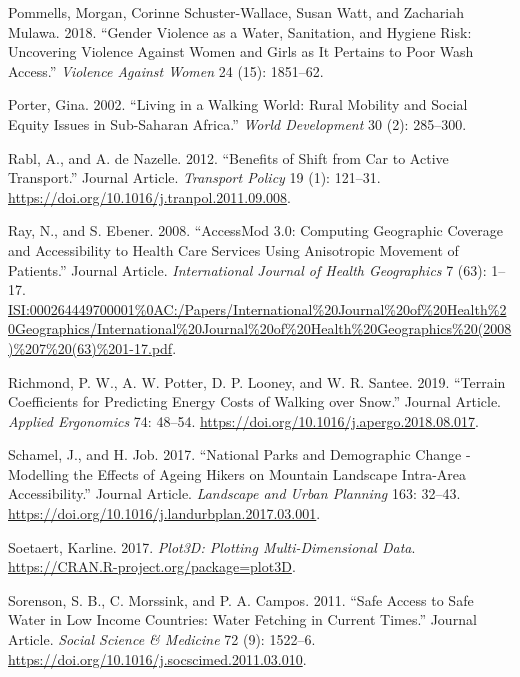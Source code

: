 \documentclass[]{elsarticle} %
\begin{document}
\leavevmode\hypertarget{ref-Pommells2018gender}{}%
Pommells, Morgan, Corinne Schuster-Wallace, Susan Watt, and Zachariah
Mulawa. 2018. ``Gender Violence as a Water, Sanitation, and Hygiene
Risk: Uncovering Violence Against Women and Girls as It Pertains to Poor
Wash Access.'' \emph{Violence Against Women} 24 (15): 1851--62.

\leavevmode\hypertarget{ref-Porter2002}{}%
Porter, Gina. 2002. ``Living in a Walking World: Rural Mobility and
Social Equity Issues in Sub-Saharan Africa.'' \emph{World Development}
30 (2): 285--300.

\leavevmode\hypertarget{ref-Rabl2012benefits}{}%
Rabl, A., and A. de Nazelle. 2012. ``Benefits of Shift from Car to
Active Transport.'' Journal Article. \emph{Transport Policy} 19 (1):
121--31. \url{https://doi.org/10.1016/j.tranpol.2011.09.008}.

\leavevmode\hypertarget{ref-Ray2008}{}%
Ray, N., and S. Ebener. 2008. ``AccessMod 3.0: Computing Geographic
Coverage and Accessibility to Health Care Services Using Anisotropic
Movement of Patients.'' Journal Article. \emph{International Journal of
Health Geographics} 7 (63): 1--17.
\url{ISI:000264449700001\%0AC:/Papers/International\%20Journal\%20of\%20Health\%20Geographics/International\%20Journal\%20of\%20Health\%20Geographics\%20(2008)\%207\%20(63)\%201-17.pdf}.

\leavevmode\hypertarget{ref-Richmond2019terrain}{}%
Richmond, P. W., A. W. Potter, D. P. Looney, and W. R. Santee. 2019.
``Terrain Coefficients for Predicting Energy Costs of Walking over
Snow.'' Journal Article. \emph{Applied Ergonomics} 74: 48--54.
\url{https://doi.org/10.1016/j.apergo.2018.08.017}.

\leavevmode\hypertarget{ref-Schamel2017}{}%
Schamel, J., and H. Job. 2017. ``National Parks and Demographic Change -
Modelling the Effects of Ageing Hikers on Mountain Landscape Intra-Area
Accessibility.'' Journal Article. \emph{Landscape and Urban Planning}
163: 32--43. \url{https://doi.org/10.1016/j.landurbplan.2017.03.001}.

\leavevmode\hypertarget{ref-Soetaert2017}{}%
Soetaert, Karline. 2017. \emph{Plot3D: Plotting Multi-Dimensional Data}.
\url{https://CRAN.R-project.org/package=plot3D}.

\leavevmode\hypertarget{ref-Sorenson2011safe}{}%
Sorenson, S. B., C. Morssink, and P. A. Campos. 2011. ``Safe Access to
Safe Water in Low Income Countries: Water Fetching in Current Times.''
Journal Article. \emph{Social Science \& Medicine} 72 (9): 1522--6.
\url{https://doi.org/10.1016/j.socscimed.2011.03.010}.
\end{document}
